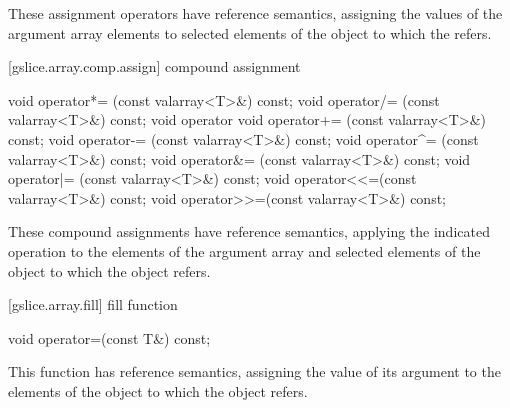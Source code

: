 \begin{itemdescr}
\pnum
These assignment operators have reference semantics, assigning the values
of the argument array elements to selected elements of the
object to which the
refers.
\end{itemdescr}

[gslice.array.comp.assign]{ compound assignment}

%
%
%
%
%
%
%
%
%
%
%
%
\begin{itemdecl}
void operator*= (const valarray<T>&) const;
void operator/= (const valarray<T>&) const;
void operator%
void operator+= (const valarray<T>&) const;
void operator-= (const valarray<T>&) const;
void operator^= (const valarray<T>&) const;
void operator&= (const valarray<T>&) const;
void operator|= (const valarray<T>&) const;
void operator<<=(const valarray<T>&) const;
void operator>>=(const valarray<T>&) const;
\end{itemdecl}

\begin{itemdescr}
\pnum
These compound assignments have reference semantics, applying the
indicated operation to the elements of the argument array and selected
elements of the
object to which the
object refers.
\end{itemdescr}

[gslice.array.fill]{ fill function}

%
\begin{itemdecl}
void operator=(const T&) const;
\end{itemdecl}

\begin{itemdescr}
\pnum
This function has reference semantics, assigning the value of its argument
to the elements of the
object to which the
object refers.
\end{itemdescr}

